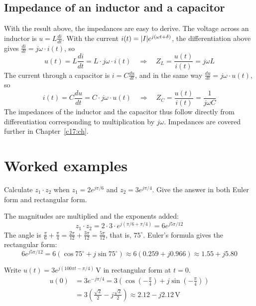 \subsection{Impedance of an inductor and a capacitor}
\label{c16:sec:impedans}
With the result above, the impedances are easy
to derive. The voltage across an inductor is $u = L\frac{di}{dt}$. With the current
$i(t) = \lvert I\rvert e^{j(\omega t + \delta)}$, the differentiation above gives
$\frac{di}{dt} = j\omega \cdot i(t)$, so
\[
  u(t) = L\frac{di}{dt} = L \cdot j\omega \cdot i(t) \quad \Rightarrow \quad
  Z_L = \frac{u(t)}{i(t)} = j\omega L
\]
The current through a capacitor is $i = C\frac{du}{dt}$, and in the same way
$\frac{du}{dt} = j\omega \cdot u(t)$, so
\[
  i(t) = C\frac{du}{dt} = C \cdot j\omega \cdot u(t) \quad \Rightarrow \quad
  Z_C = \frac{u(t)}{i(t)} = \frac{1}{j\omega C}
\]
The impedances of the inductor and the capacitor thus follow directly from differentiation
corresponding to multiplication by $j\omega$. Impedances are covered further in
Chapter~\ref{c17:ch}.

\section{Worked examples}
\label{c16:sec:typexempel}

\begin{exempel}
Calculate $z_1 \cdot z_2$ when $z_1 = 2e^{j\pi/6}$ and $z_2 = 3e^{j\pi/4}$. Give the answer in both
Euler form and rectangular form.

The magnitudes are multiplied and the exponents added:
\[
  z_1 \cdot z_2 = 2 \cdot 3 \cdot e^{j(\pi/6 + \pi/4)} = 6e^{j5\pi/12}
\]
The angle is $\frac{\pi}{6} + \frac{\pi}{4} = \frac{2\pi}{12} + \frac{3\pi}{12} = \frac{5\pi}{12}$,
that is, $75^{\circ}$. Euler's formula gives the rectangular form:
\[
  6e^{j5\pi/12} = 6\left(\cos 75^{\circ} + j\sin 75^{\circ}\right)
    \approx 6(0.259 + j0.966) \approx 1.55 + j5.80
\]
\end{exempel}

\begin{exempel}
Write $u(t) = 3e^{j(100\pi t - \pi/4)}\,\text{V}$ in rectangular form at $t = 0$.
\begin{align*}
  u(0) &= 3e^{-j\pi/4}
        = 3\left(\cos\left(-\frac{\pi}{4}\right) + j\sin\left(-\frac{\pi}{4}\right)\right) \\
       &= 3\left(\frac{\sqrt{2}}{2} - j\frac{\sqrt{2}}{2}\right) \approx 2.12 - j2.12\,\text{V}
\end{align*}
\end{exempel}


